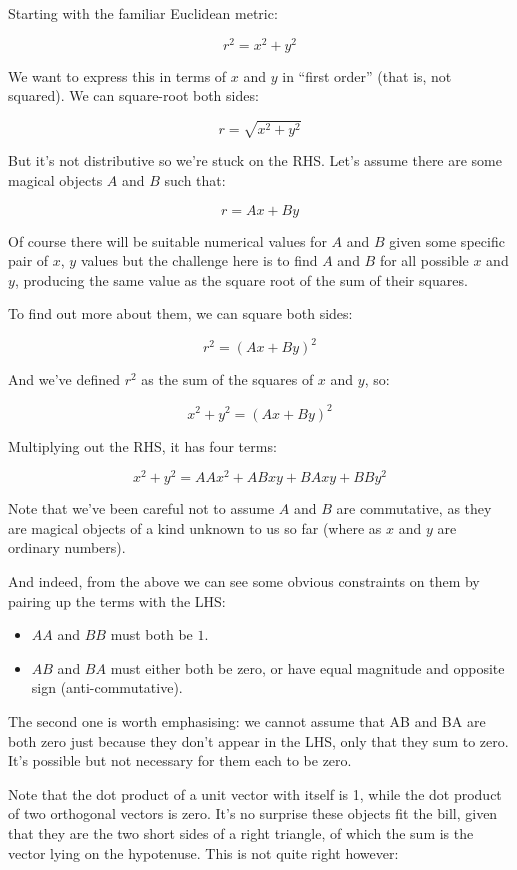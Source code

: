 Starting with the familiar Euclidean metric:

$$r^2 = x^2 + y^2$$

We want to express this in terms of $x$ and $y$ in ``first order'' (that is, not squared). We can square-root both sides:

$$r = \sqrt{x^2 + y^2}$$

But it's not distributive so we're stuck on the RHS. Let's assume there are some magical objects $A$ and $B$ such that:

$$r = Ax + By$$

Of course there will be suitable numerical values for $A$ and $B$ given some specific pair of $x$, $y$ values but the challenge here is to find $A$ and $B$ for all possible $x$ and $y$, producing the same value as the square root of the sum of their squares.

To find out more about them, we can square both sides:

$$r^2 = (Ax + By)^2$$

And we've defined $r^2$ as the sum of the squares of $x$ and $y$, so:

$$x^2 + y^2 = (Ax + By)^2$$

Multiplying out the RHS, it has four terms:

$$
x^2 + y^2
= AAx^2 + ABxy + BAxy + BBy^2
$$

Note that we've been careful not to assume $A$ and $B$ are commutative, as they are magical objects of a kind unknown to us so far (where as $x$ and $y$ are ordinary numbers).

And indeed, from the above we can see some obvious constraints on them by pairing up the terms with the LHS:

\begin{itemize}
    \item $AA$ and $BB$ must both be $1$.
    \item $AB$ and $BA$ must either both be zero, or have equal magnitude and opposite sign (anti-commutative).
\end{itemize}

The second one is worth emphasising: we cannot assume that AB and BA are both zero just because they don't appear in the LHS, only that they sum to zero. It's possible but not necessary for them each to be zero.

Note that the dot product of a unit vector with itself is 1, while the dot product of two orthogonal vectors is zero. It's no surprise these objects fit the bill, given that they are the two short sides of a right triangle, of which the sum is the vector lying on the hypotenuse. This is not quite right however:

